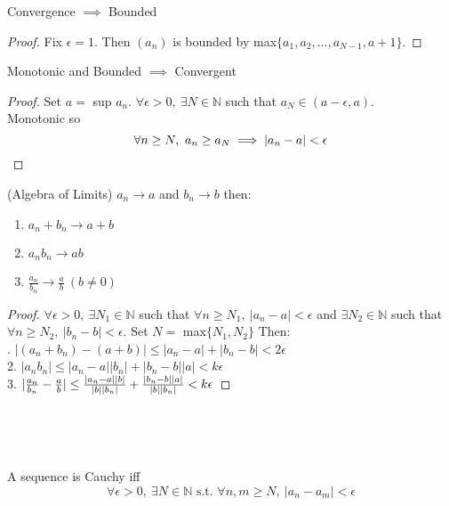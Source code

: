 \begin{theorem}
Convergence $\implies$ Bounded	
\end{theorem}
\begin{proof}
Fix $\epsilon =1$. Then $(a_n)$ is bounded by max$\{a_1,a_2,\dots,a_{N-1},a+1\}$.
\end{proof}

\begin{theorem}
Monotonic and Bounded $\implies$ Convergent	
\end{theorem}

\begin{proof}
Set $a =$ sup $a_n$. $\forall \epsilon >0,~ \exists N \in \mathbb{N}$ such that $a_N\in (a-\epsilon,a)$.\\ Monotonic so \[\forall n \geq N,~a_n\geq a_N \implies |a_n - a| < \epsilon\qedhere\]	
\end{proof}\vspace*{5pt}

\begin{theorem}(Algebra of Limits)
$a_n \to a$ and $b_n \to b$ then:\begin{enumerate}
\item $a_n+b_n \to a+b$
\item $a_nb_n \to ab$
\item $\frac{a_n}{b_n} \to \frac{a}{b} ~(b \neq 0)$
\end{enumerate}
\end{theorem}
\begin{proof}
$\forall \epsilon > 0,~ \exists N_1 \in \mathbb{N}$ such that $\forall n\geq N_1,~ |a_n	 - a| < \epsilon$ and $\exists N_2 \in \mathbb{N}$ such that $\forall n \geq N_2,~ |b_n - b| < \epsilon$. Set $N =$ max$\{N_1,N_2\}$ Then:\\

. $|(a_n + b_n) - (a+b)| \leq |a_n -a| + |b_n -b| < 2 \epsilon $\\
2. $|a_nb_n| \leq |a_n-a||b_n| + |b_n-b||a| < k\epsilon$\vspace*{5pt}\\
3. $|\frac{a_n}{b_n} - \frac{a}{b}| \leq \frac{|a_n - a||b|}{|b||b_n|} + \frac{|b_n-b||a|}{|b||b_n|} < k \epsilon \qedhere $ 
\end{proof}~


~
\begin{definition}
	A sequence is Cauchy iff
	\[\forall \epsilon >0,~\exists N \in \mathbb{N} \text{ s.t. } \forall n,m \geq N,~ |a_n - a_m| < \epsilon\]
\end{definition}

